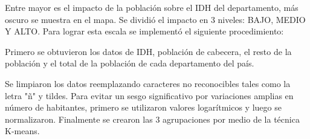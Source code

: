 \documentclass{article}
\begin{document}
Entre mayor es el impacto de la población sobre el IDH del departamento, más oscuro se muestra en el mapa. Se dividió el impacto en 3 niveles: BAJO, MEDIO Y ALTO.
Para lograr esta escala se implementó el siguiente procedimiento:

Primero se obtuvieron los datos de IDH, población de cabecera, el resto de la población y el total de la población de cada departamento del país.

Se limpiaron los datos reemplazando caracteres no reconocibles tales como la letra "ñ" y tildes.
Para evitar un sesgo significativo por variaciones amplias en número de habitantes, primero se utilizaron valores logarítmicos y luego se normalizaron. Finalmente se crearon las 3 agrupaciones por medio de la técnica K-means.
\end{document}
